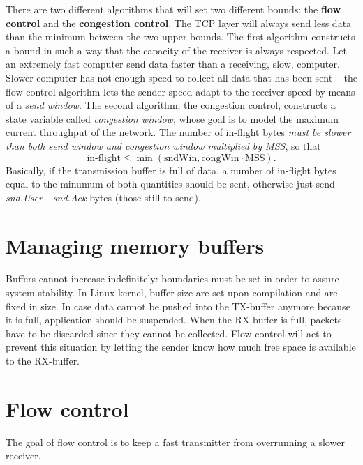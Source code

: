 \documentclass[10pt]{book}
\begin{document}
There are two different algorithms that will set two different bounds: the
\textbf{flow control} and the \textbf{congestion control}. The TCP layer will
always send less data than the minimum between the two upper bounds. The first
algorithm constructs a bound in such a way that the capacity of the receiver is
always respected. Let an extremely fast computer send data faster than a
receiving, slow, computer. Slower computer has not enough speed to collect all
data that has been sent \--- the flow control algorithm lets the sender speed
adapt to the receiver speed by means of a \emph{send window}. The second
algorithm, the congestion control, constructs a state variable called
\emph{congestion window}, whose goal is to model the maximum current throughput
of the network. The number of in-flight bytes \emph{must be slower than both
send window and congestion window multiplied by MSS}, so that
$$\mbox{in-flight} \leq \min(\mbox{sndWin}, \mbox{congWin} \cdot \mbox{MSS}).$$
Basically, if the transmission buffer is full of data, a number of in-flight
bytes equal to the minumum of both quantities should be sent, otherwise just
send \emph{snd.User - snd.Ack} bytes (those still to send).

\section{Managing memory buffers}

Buffers cannot increase indefinitely: boundaries must be set in order to assure
system stability. In Linux kernel, buffer size are set upon compilation and are
fixed in size. In case data cannot be pushed into the TX-buffer anymore because
it is full, application should be suspended. When the RX-buffer is full,
packets have to be discarded since they cannot be collected. Flow control will
act to prevent this situation by letting the sender know how much free space is
available to the RX-buffer.
\section{Flow control}

The goal of flow control is to keep a fast transmitter from overrunning a
slower receiver.
\end{document}
